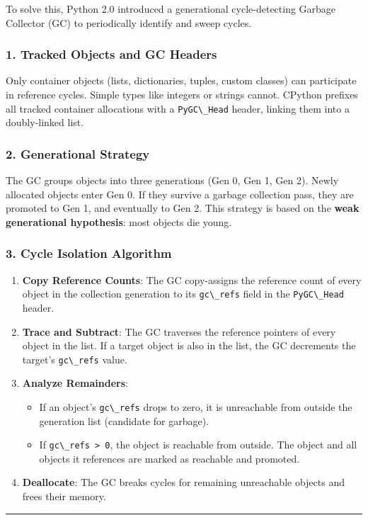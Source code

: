 To solve this, Python 2.0 introduced a generational cycle-detecting
Garbage Collector (GC) to periodically identify and sweep cycles.

\hypertarget{tracked-objects-and-gc-headers}{%
\subsubsection{1. Tracked Objects and GC
Headers}\label{tracked-objects-and-gc-headers}}

Only container objects (lists, dictionaries, tuples, custom classes) can
participate in reference cycles. Simple types like integers or strings
cannot. CPython prefixes all tracked container allocations with a
\passthrough{\lstinline!PyGC\_Head!} header, linking them into a
doubly-linked list.

\hypertarget{generational-strategy}{%
\subsubsection{2. Generational Strategy}\label{generational-strategy}}

The GC groups objects into three generations (Gen 0, Gen 1, Gen 2).
Newly allocated objects enter Gen 0. If they survive a garbage
collection pass, they are promoted to Gen 1, and eventually to Gen 2.
This strategy is based on the \textbf{weak generational hypothesis}:
most objects die young.

\hypertarget{cycle-isolation-algorithm}{%
\subsubsection{3. Cycle Isolation
Algorithm}\label{cycle-isolation-algorithm}}

\begin{enumerate}
\def\labelenumi{\arabic{enumi}.}
\tightlist
\item
  \textbf{Copy Reference Counts}: The GC copy-assigns the reference
  count of every object in the collection generation to its
  \passthrough{\lstinline!gc\_refs!} field in the
  \passthrough{\lstinline!PyGC\_Head!} header.
\item
  \textbf{Trace and Subtract}: The GC traverses the reference pointers
  of every object in the list. If a target object is also in the list,
  the GC decrements the target's \passthrough{\lstinline!gc\_refs!}
  value.
\item
  \textbf{Analyze Remainders}:

  \begin{itemize}
  \tightlist
  \item
    If an object's \passthrough{\lstinline!gc\_refs!} drops to zero, it
    is unreachable from outside the generation list (candidate for
    garbage).
  \item
    If \passthrough{\lstinline!gc\_refs > 0!}, the object is reachable
    from outside. The object and all objects it references are marked as
    reachable and promoted.
  \end{itemize}
\item
  \textbf{Deallocate}: The GC breaks cycles for remaining unreachable
  objects and frees their memory.
\end{enumerate}

\begin{center}\rule{0.5\linewidth}{0.5pt}\end{center}
